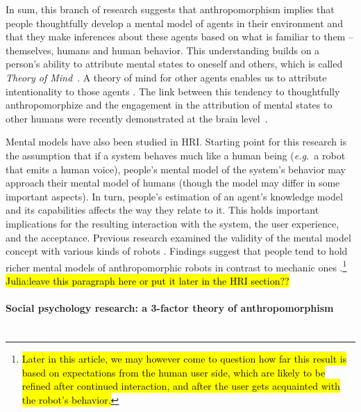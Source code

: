 \documentclass{frontiersSCNS} %
\newcommand{\eg}{{\textit{e.g.~}}}
\begin{document}
In sum, this branch of research suggests that anthropomorphism implies that people thoughtfully develop a mental model of agents in their environment and that they make inferences about these agents based on what is familiar to them -- themselves, humans and human behavior. This understanding builds on a person's ability to attribute mental states to oneself and others, which is called \textit{Theory of Mind}~\citep{Premack1978}. A theory of mind for other agents enables us to attribute intentionality to those agents \citep{leslie_pretense_1987,admoni_multi-category_2012}. The link between this tendency to thoughtfully anthropomorphize and the engagement in the attribution of mental states to other humans were recently demonstrated at the brain level~\citep{cullen2013individual}.



Mental models have also been studied in HRI. Starting point for this research is the assumption that if a system behaves much like a human being (\eg a robot that emits a human voice), people's mental model of the system's behavior may approach their mental model of humans (though the model may differ in some important aspects). In turn, people's estimation of an agent's knowledge model and its capabilities affects the way they relate to it. This holds important implications for the resulting interaction with the system, the user experience, and the acceptance. Previous research examined the validity of the mental model concept with various kinds of robots \cite{schmitz_concepts_2011,kiesler_mental_2002}. Findings suggest that people tend to hold richer mental models of anthropomorphic robots in contrast to mechanic ones \cite{kiesler_mental_2002}.\footnote{\hl{Later in this article, we may however come to question how far this result is based on expectations from the human user side, which are likely to be refined after continued interaction, and after the user gets acquainted with the robot's behavior.}} \hl{Julia:leave this paragraph here or put it later in the HRI section??}


\paragraph*{Social psychology research: a 3-factor theory of anthropomorphism\\ \\}
\label{sec:psychological-factors}
\end{document}
